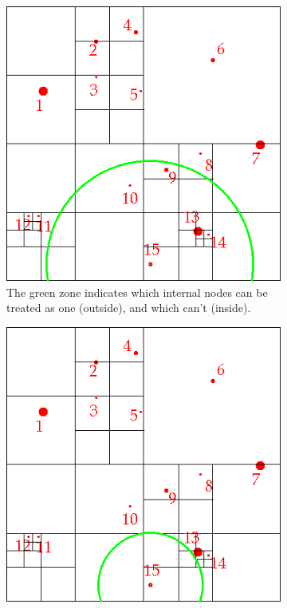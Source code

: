 \begin{figure}[H]
\begin{subfigure}{0.24\textwidth}
\includegraphics[width=\textwidth]{barneshut_map_green_3.png}
\caption{The green zone indicates which internal nodes can be treated as one (outside), and which can't (inside).}
\end{subfigure}\hspace{1cm}
\begin{subfigure}{0.24\textwidth}
\includegraphics[width=\textwidth]{barneshut_map_green_4.png}

\end{subfigure}
\end{figure}
